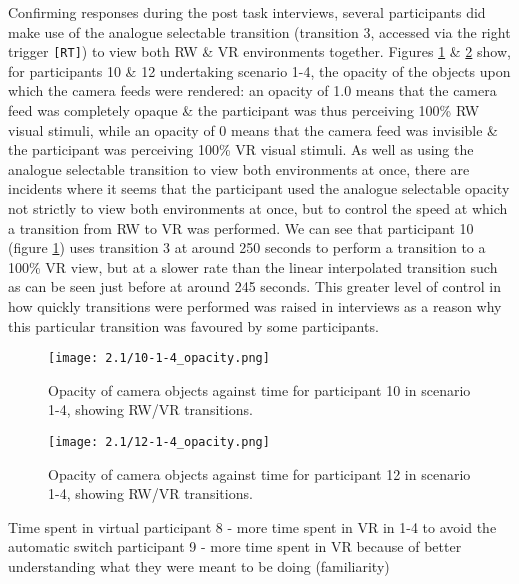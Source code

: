 Confirming responses during the post task interviews, several participants did make use of the analogue selectable transition (transition 3, accessed via the right trigger \texttt{[RT]}) to view both RW \& VR environments together. Figures \ref{10-1-4_opacity.png} \& \ref{12-1-4_opacity.png} show, for participants 10 \& 12 undertaking scenario 1-4, the opacity of the objects upon which the camera feeds were rendered: an opacity of 1.0 means that the camera feed was completely opaque \& the participant was thus perceiving 100\% RW visual stimuli, while an opacity of 0 means that the camera feed was invisible \& the participant was perceiving 100\% VR visual stimuli. As well as using the analogue selectable transition to view both environments at once, there are incidents where it seems that the participant used the analogue selectable opacity not strictly to view both environments at once, but to control the speed at which a transition from RW to VR was performed. We can see that participant 10 (figure \ref{10-1-4_opacity.png}) uses transition 3 at around 250 seconds to perform a transition to a 100\% VR view, but at a slower rate than the linear interpolated transition such as can be seen just before at around 245 seconds. This greater level of control in how quickly transitions were performed was raised in interviews as a reason why this particular transition was favoured by some participants.

\begin{figure}[h]
	\begin{center}
	\texttt{[image: 2.1/10-1-4\_opacity.png]}
	\caption{Opacity of camera objects against time for participant 10 in scenario 1-4, showing RW/VR transitions.}
	\label{10-1-4_opacity.png}
	\end{center}
\end{figure}

\begin{figure}[h]
	\begin{center}
	\texttt{[image: 2.1/12-1-4\_opacity.png]}
	\caption{Opacity of camera objects against time for participant 12 in scenario 1-4, showing RW/VR transitions.}
	\label{12-1-4_opacity.png}
	\end{center}
\end{figure}








Time spent in virtual
	participant 8 - more time spent in VR in 1-4 to avoid the automatic switch
	participant 9 - more time spent in VR because of better understanding what they were meant to be doing (familiarity)
	
